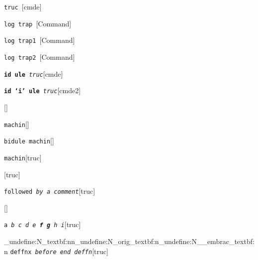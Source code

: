 \documentclass{book}
\begin{document}
%
%
\noindent\texttt{truc \EmbracOn{}\textnormal{\textsl{}}\EmbracOff{}}\hfill[cmde]



%
\noindent\texttt{log trap \EmbracOn{}\textnormal{\textsl{}}\EmbracOff{}}\hfill[Command]



%
\noindent\texttt{log trap1 \EmbracOn{}\textnormal{\textsl{}}\EmbracOff{}}\hfill[Command]



%
\noindent\texttt{log trap2 \EmbracOn{}\textnormal{\textsl{}}\EmbracOff{}}\hfill[Command]



%
\noindent\texttt{\textbf{id ule} \EmbracOn{}\textnormal{\textsl{truc}}\EmbracOff{}}\hfill[cmde]



%
\noindent\texttt{\textbf{id `\texttt{i}' ule} \EmbracOn{}\textnormal{\textsl{truc}}\EmbracOff{}}\hfill[cmde2]



%
\noindent\texttt{}\hfill[]



\noindent\texttt{machin}\hfill[]



%
\noindent\texttt{bidule machin}\hfill[]



%
\noindent\texttt{machin}\hfill[truc]



%
\noindent\texttt{}\hfill[truc]



\noindent\texttt{followed \EmbracOn{}\textnormal{\textsl{by a comment}}\EmbracOff{}}\hfill[truc]



%
\noindent\texttt{}\hfill[]



\noindent\texttt{a \EmbracOn{}\textnormal{\textsl{b c d e \textbf{f g} h i}}\EmbracOff{}}\hfill[truc]


\ExplSyntaxOn%
\cs_undefine:N{\embrac_textbf:nn}\cs_undefine:N{\embrac_orig_textbf:n}\cs_undefine:N{\__embrac_textbf:n}%
\ExplSyntaxOff%
%
\noindent\texttt{deffnx \EmbracOn{}\textnormal{\textsl{before end deffn}}\EmbracOff{}}\hfill[truc]
\end{document}
